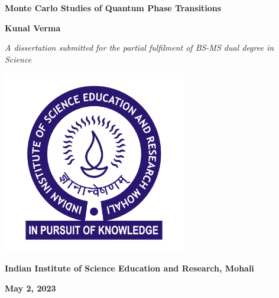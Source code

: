 \documentclass[a4paper,12pt]{report}
\numberwithin{equation}{section}
\begin{document}
\begin{titlepage}

  \begin{center}
  
      \vspace*{0.5cm}
      
      \LARGE
      \textbf{Monte Carlo Studies of Quantum Phase Transitions}
  
      \vspace{2cm}
      \Large
      \textbf{Kunal Verma}
      \vspace{1cm}
      
      \large
      \textit{A dissertation submitted for the partial fulfilment of
      BS-MS dual degree in Science}
      
      \vspace{1cm}
  
      \includegraphics[width=8cm]{images/HighResolutionLogo.jpg}
  
      \vspace{1cm}

      \large
      \textbf{Indian Institute of Science Education and Research, Mohali}\\
      \large
      
      \vspace{1cm}
      
      \textbf{May 2, 2023}
  \end{center}
\end{titlepage}
  
\end{document}
